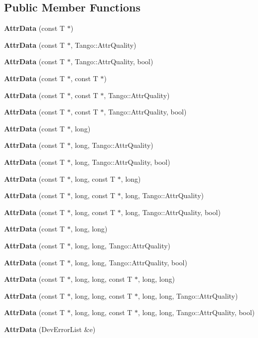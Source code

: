 \subsection*{Public Member Functions}
\begin{DoxyCompactItemize}
\item 
{\bf Attr\-Data} (const T $\ast$)
\item 
{\bf Attr\-Data} (const T $\ast$, Tango\-::\-Attr\-Quality)
\item 
{\bf Attr\-Data} (const T $\ast$, Tango\-::\-Attr\-Quality, bool)
\item 
{\bf Attr\-Data} (const T $\ast$, const T $\ast$)
\item 
{\bf Attr\-Data} (const T $\ast$, const T $\ast$, Tango\-::\-Attr\-Quality)
\item 
{\bf Attr\-Data} (const T $\ast$, const T $\ast$, Tango\-::\-Attr\-Quality, bool)
\item 
{\bf Attr\-Data} (const T $\ast$, long)
\item 
{\bf Attr\-Data} (const T $\ast$, long, Tango\-::\-Attr\-Quality)
\item 
{\bf Attr\-Data} (const T $\ast$, long, Tango\-::\-Attr\-Quality, bool)
\item 
{\bf Attr\-Data} (const T $\ast$, long, const T $\ast$, long)
\item 
{\bf Attr\-Data} (const T $\ast$, long, const T $\ast$, long, Tango\-::\-Attr\-Quality)
\item 
{\bf Attr\-Data} (const T $\ast$, long, const T $\ast$, long, Tango\-::\-Attr\-Quality, bool)
\item 
{\bf Attr\-Data} (const T $\ast$, long, long)
\item 
{\bf Attr\-Data} (const T $\ast$, long, long, Tango\-::\-Attr\-Quality)
\item 
{\bf Attr\-Data} (const T $\ast$, long, long, Tango\-::\-Attr\-Quality, bool)
\item 
{\bf Attr\-Data} (const T $\ast$, long, long, const T $\ast$, long, long)
\item 
{\bf Attr\-Data} (const T $\ast$, long, long, const T $\ast$, long, long, Tango\-::\-Attr\-Quality)
\item 
{\bf Attr\-Data} (const T $\ast$, long, long, const T $\ast$, long, long, Tango\-::\-Attr\-Quality, bool)
\item 
{\bf Attr\-Data} (Dev\-Error\-List \&e)
\end{DoxyCompactItemize}
